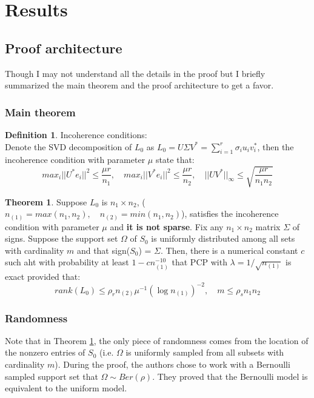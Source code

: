 \documentclass[12pt]{extarticle}
\newcommand{\<}{\langle}
\renewcommand{\>}{\rangle}
\theoremstyle{definition}
\newtheorem{theorem}{Theorem}
\newtheorem*{definition}{Definition}
\begin{document}
\section{Results}

\subsection{Proof architecture}
Though I may not understand all the details in the proof but I briefly summarized the main theorem and the proof architecture to get a favor.

\subsubsection{Main theorem}
\begin{definition}
Incoherence conditions: \\
Denote the SVD decomposition of $L_0$ as $L_0 = U \Sigma V^* = \sum_{i=1}^r \sigma_i u_i v_i^*$, then the incoherence condition with parameter $\mu$ state that: 
\begin{equation}
    \label{incoherence}
    max_i ||U^*e_i||^2 \leq \frac{\mu r}{n_1}, \quad  max_i ||V^*e_i||^2 \leq \frac{\mu r}{n_2}, \quad ||UV^*||_\infty \leq \sqrt{\frac{\mu r}{n_1n_2}}
\end{equation}
\end{definition}


\begin{theorem}
\label{main}
Suppose $L_0$ is $n_1 \times n_2$, ($n_{(1)} = max(n_1,n_2),\quad n_{(2)} = min(n_1,n_2)$), satisfies the incoherence condition with parameter $\mu$ and \textbf{it is not sparse}. Fix any $n_1 \times n_2$ matrix $\Sigma$ of signs. Suppose the support set $\Omega$ of $S_0$ is uniformly distributed among all sets with cardinality $m$ and that sign($S_0$) = $\Sigma$. Then, there is a numerical constant $c$ such aht with probability at least $1-cn_{(1)}^{-10}$ that PCP with $\lambda = 1/\sqrt{n_{(1)}}$ is exact provided that:
\begin{equation}
 rank(L_0) \leq \rho_r n_{(2)}\mu^{-1}(\log n_{(1)})^{-2},\quad m \leq \rho_s n_1 n_2
\end{equation}
\end{theorem}

\subsubsection{Randomness}
Note that in Theorem \ref{main}, the only piece of randomness comes from the location of the nonzero entries of $S_0$ (i.e. $\Omega$ is uniformly sampled from all subsets with cardinality $m$). During the proof, the authors chose to work with a Bernoulli sampled support set that $\Omega \sim Ber(\rho)$. They proved that the Bernoulli model is equivalent to the uniform model. 
\end{document}
